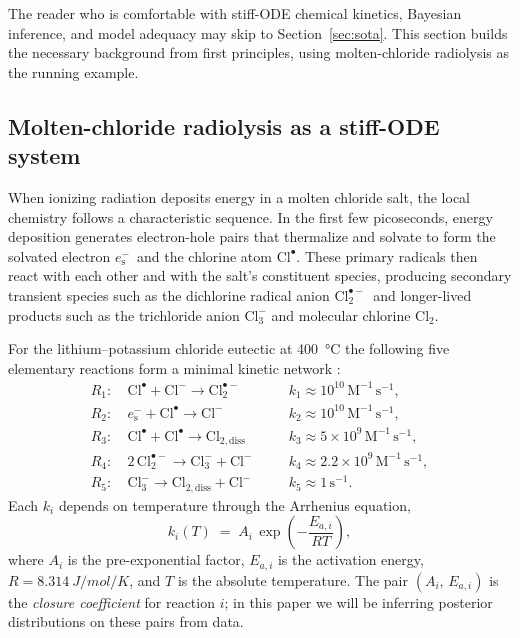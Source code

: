 \documentclass[12pt]{article}
\theoremstyle{plain}
\theoremstyle{definition}
\theoremstyle{remark}
\newcommand{\eS}{\ensuremath{e_{\mathrm{s}}^{-}}\xspace}
\newcommand{\Clt}{\ensuremath{\mathrm{Cl}_2^{\bullet-}}\xspace}
\begin{document}
The reader who is comfortable with stiff-ODE chemical kinetics, Bayesian
inference, and model adequacy may skip to Section~\ref{sec:sota}.  This
section builds the necessary background from first principles, using
molten-chloride radiolysis as the running example.

\subsection{Molten-chloride radiolysis as a stiff-ODE system}\label{sec:bg:radiolysis}

When ionizing radiation deposits energy in a molten chloride salt, the local
chemistry follows a characteristic sequence.  In the first few picoseconds,
energy deposition generates electron-hole pairs that thermalize and solvate to
form the solvated electron \eS\ and the chlorine atom $\mathrm{Cl}^\bullet$.
These primary radicals then react with each other and with the salt's
constituent species, producing secondary transient species such as the
dichlorine radical anion \Clt\ and longer-lived products such as the
trichloride anion $\mathrm{Cl}_3^-$ and molecular chlorine $\mathrm{Cl}_2$.

For the lithium--potassium chloride eutectic at \SI{400}{\celsius} the
following five elementary reactions form a minimal kinetic network
\citep{Iwamatsu2022,Hagiwara1987}:
%
\begin{align}
  R_1\colon\ &\mathrm{Cl}^\bullet + \mathrm{Cl}^- \longrightarrow \Clt
            && \quad k_1 \approx 10^{10}\,\mathrm{M}^{-1}\,\mathrm{s}^{-1}, \label{eq:R1}\\
  R_2\colon\ &\eS + \mathrm{Cl}^\bullet \longrightarrow \mathrm{Cl}^-
            && \quad k_2 \approx 10^{10}\,\mathrm{M}^{-1}\,\mathrm{s}^{-1}, \label{eq:R2}\\
  R_3\colon\ &\mathrm{Cl}^\bullet + \mathrm{Cl}^\bullet \longrightarrow \mathrm{Cl}_{2,\mathrm{diss}}
            && \quad k_3 \approx 5\times 10^{9}\,\mathrm{M}^{-1}\,\mathrm{s}^{-1}, \label{eq:R3}\\
  R_4\colon\ &2\,\Clt \longrightarrow \mathrm{Cl}_3^- + \mathrm{Cl}^-
            && \quad k_4 \approx 2.2\times 10^{9}\,\mathrm{M}^{-1}\,\mathrm{s}^{-1}, \label{eq:R4}\\
  R_5\colon\ &\mathrm{Cl}_3^- \longrightarrow \mathrm{Cl}_{2,\mathrm{diss}} + \mathrm{Cl}^-
            && \quad k_5 \approx 1\,\mathrm{s}^{-1}. \label{eq:R5}
\end{align}
Each $k_i$ depends on temperature through the Arrhenius equation,
%
\begin{equation}
  k_i(T) \;=\; A_i\,\exp\!\left(-\frac{E_{a,i}}{RT}\right),
  \label{eq:arrhenius}
\end{equation}
%
where $A_i$ is the pre-exponential factor, $E_{a,i}$ is the activation energy,
$R = \SI{8.314}{J\per mol\per K}$, and $T$ is the absolute temperature.
The pair $(A_i,\,E_{a,i})$ is the \emph{closure coefficient} for reaction $i$;
in this paper we will be inferring posterior distributions on these pairs
from data.
\end{document}
